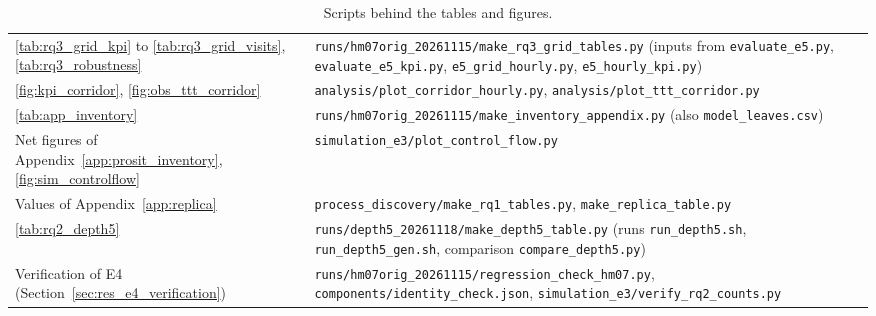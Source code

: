 \begin{table}[htbp]
\begin{tabularx}{\textwidth}{L{4.6cm}Y}
\ref{tab:rq3_grid_kpi} to \ref{tab:rq3_grid_visits}, \ref{tab:rq3_robustness} & \nolinkurl{runs/hm07orig_20261115/make_rq3_grid_tables.py} (inputs from \nolinkurl{evaluate_e5.py}, \nolinkurl{evaluate_e5_kpi.py}, \nolinkurl{e5_grid_hourly.py}, \nolinkurl{e5_hourly_kpi.py}) \\
\ref{fig:kpi_corridor}, \ref{fig:obs_ttt_corridor} & \nolinkurl{analysis/plot_corridor_hourly.py}, \nolinkurl{analysis/plot_ttt_corridor.py} \\
\ref{tab:app_inventory} & \nolinkurl{runs/hm07orig_20261115/make_inventory_appendix.py} (also \nolinkurl{model_leaves.csv}) \\
Net figures of Appendix~\ref{app:prosit_inventory}, \ref{fig:sim_controlflow} & \nolinkurl{simulation_e3/plot_control_flow.py} \\
Values of Appendix~\ref{app:replica} & \nolinkurl{process_discovery/make_rq1_tables.py}, \nolinkurl{make_replica_table.py} \\
\ref{tab:rq2_depth5} & \nolinkurl{runs/depth5_20261118/make_depth5_table.py} (runs \nolinkurl{run_depth5.sh}, \nolinkurl{run_depth5_gen.sh}, comparison \nolinkurl{compare_depth5.py}) \\
Verification of E4 (Section~\ref{sec:res_e4_verification}) & \nolinkurl{runs/hm07orig_20261115/regression_check_hm07.py}, \nolinkurl{components/identity_check.json}, \nolinkurl{simulation_e3/verify_rq2_counts.py} \\
\bottomrule
\end{tabularx}
\caption{Scripts behind the tables and figures.}
\label{tab:app_sources}
\end{table}
